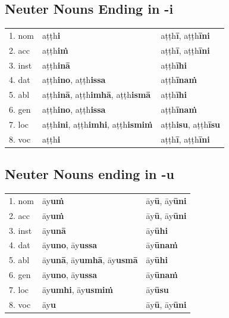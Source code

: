 \documentclass[11pt,oneside]{memoir}
\begin{document}
\subsection{Neuter Nouns Ending in -i}
\label{sec:org86599e7}

\begin{center}
\begin{tabular}{lll}
1. nom & aṭṭh\textbf{i} & aṭṭh\textbf{ī}, aṭṭh\textbf{īni}\\
2. acc & aṭṭh\textbf{iṁ} & aṭṭh\textbf{ī}, aṭṭh\textbf{īni}\\
3. inst & aṭṭh\textbf{inā} & aṭṭh\textbf{īhi}\\
4. dat & aṭṭh\textbf{ino}, aṭṭh\textbf{issa} & aṭṭh\textbf{īnaṁ}\\
5. abl & aṭṭh\textbf{inā}, aṭṭh\textbf{imhā}, aṭṭh\textbf{ismā} & aṭṭh\textbf{īhi}\\
6. gen & aṭṭh\textbf{ino}, aṭṭh\textbf{issa} & aṭṭh\textbf{īnaṁ}\\
7. loc & aṭṭh\textbf{ini}, aṭṭh\textbf{imhi}, aṭṭh\textbf{ismiṁ} & aṭṭh\textbf{isu}, aṭṭh\textbf{īsu}\\
8. voc & aṭṭh\textbf{i} & aṭṭh\textbf{ī}, aṭṭh\textbf{īni}\\
\end{tabular}
\end{center}
\subsection{Neuter Nouns ending in -u}
\label{sec:orga696f34}

\begin{center}
\begin{tabular}{lll}
1. nom & āy\textbf{uṁ} & āy\textbf{ū}, āy\textbf{ūni}\\
2. acc & āy\textbf{uṁ} & āy\textbf{ū}, āy\textbf{ūni}\\
3. inst & āy\textbf{unā} & āy\textbf{ūhi}\\
4. dat & āy\textbf{uno}, āy\textbf{ussa} & āy\textbf{ūnaṁ}\\
5. abl & āy\textbf{unā}, āy\textbf{umhā}, āy\textbf{usmā} & āy\textbf{ūhi}\\
6. gen & āy\textbf{uno}, āy\textbf{ussa} & āy\textbf{ūnaṁ}\\
7. loc & āy\textbf{umhi}, āy\textbf{usmiṁ} & āy\textbf{ūsu}\\
8. voc & āy\textbf{u} & āy\textbf{ū}, āy\textbf{ūni}\\
\end{tabular}
\end{center}
\end{document}

